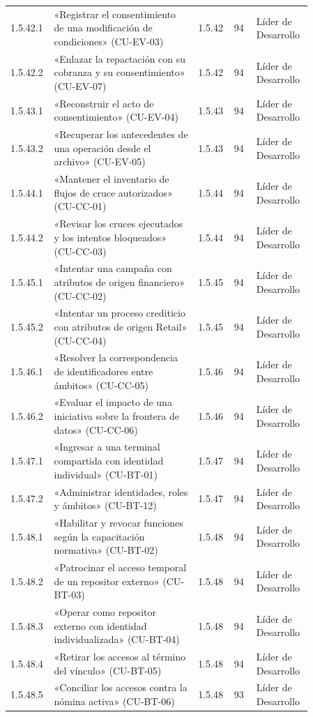 \begin{longtable}{@{}p{0.075\linewidth}p{0.451\linewidth}p{0.075\linewidth}p{0.075\linewidth}p{0.179\linewidth}@{}}
1.5.42.1 & «Registrar el consentimiento de una modificación de condiciones» (CU-EV-03) & 1.5.42 & 94 & Líder de Desarrollo \\
1.5.42.2 & «Enlazar la repactación con su cobranza y su consentimiento» (CU-EV-07) & 1.5.42 & 94 & Líder de Desarrollo \\
1.5.43.1 & «Reconstruir el acto de consentimiento» (CU-EV-04) & 1.5.43 & 94 & Líder de Desarrollo \\
1.5.43.2 & «Recuperar los antecedentes de una operación desde el archivo» (CU-EV-05) & 1.5.43 & 94 & Líder de Desarrollo \\
1.5.44.1 & «Mantener el inventario de flujos de cruce autorizados» (CU-CC-01) & 1.5.44 & 94 & Líder de Desarrollo \\
1.5.44.2 & «Revisar los cruces ejecutados y los intentos bloqueados» (CU-CC-03) & 1.5.44 & 94 & Líder de Desarrollo \\
1.5.45.1 & «Intentar una campaña con atributos de origen financiero» (CU-CC-02) & 1.5.45 & 94 & Líder de Desarrollo \\
1.5.45.2 & «Intentar un proceso crediticio con atributos de origen Retail» (CU-CC-04) & 1.5.45 & 94 & Líder de Desarrollo \\
1.5.46.1 & «Resolver la correspondencia de identificadores entre ámbitos» (CU-CC-05) & 1.5.46 & 94 & Líder de Desarrollo \\
1.5.46.2 & «Evaluar el impacto de una iniciativa sobre la frontera de datos» (CU-CC-06) & 1.5.46 & 94 & Líder de Desarrollo \\
1.5.47.1 & «Ingresar a una terminal compartida con identidad individual» (CU-BT-01) & 1.5.47 & 94 & Líder de Desarrollo \\
1.5.47.2 & «Administrar identidades, roles y ámbitos» (CU-BT-12) & 1.5.47 & 94 & Líder de Desarrollo \\
1.5.48.1 & «Habilitar y revocar funciones según la capacitación normativa» (CU-BT-02) & 1.5.48 & 94 & Líder de Desarrollo \\
1.5.48.2 & «Patrocinar el acceso temporal de un repositor externo» (CU-BT-03) & 1.5.48 & 94 & Líder de Desarrollo \\
1.5.48.3 & «Operar como repositor externo con identidad individualizada» (CU-BT-04) & 1.5.48 & 94 & Líder de Desarrollo \\
1.5.48.4 & «Retirar los accesos al término del vínculo» (CU-BT-05) & 1.5.48 & 94 & Líder de Desarrollo \\
1.5.48.5 & «Conciliar los accesos contra la nómina activa» (CU-BT-06) & 1.5.48 & 93 & Líder de Desarrollo \\

\end{longtable}
